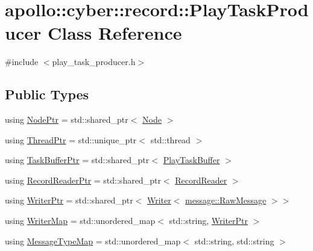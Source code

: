 \hypertarget{classapollo_1_1cyber_1_1record_1_1PlayTaskProducer}{\section{apollo\-:\-:cyber\-:\-:record\-:\-:Play\-Task\-Producer Class Reference}
\label{classapollo_1_1cyber_1_1record_1_1PlayTaskProducer}
}


{\ttfamily \#include $<$play\-\_\-task\-\_\-producer.\-h$>$}

\subsection*{Public Types}
\begin{DoxyCompactItemize}
\item 
using \hyperlink{classapollo_1_1cyber_1_1record_1_1PlayTaskProducer_a60273f70488f8bb52d6112a32ec502bb}{Node\-Ptr} = std\-::shared\-\_\-ptr$<$ \hyperlink{classapollo_1_1cyber_1_1Node}{Node} $>$
\item 
using \hyperlink{classapollo_1_1cyber_1_1record_1_1PlayTaskProducer_a55cdb4cb1be634a50c15e7c78b6b11ff}{Thread\-Ptr} = std\-::unique\-\_\-ptr$<$ std\-::thread $>$
\item 
using \hyperlink{classapollo_1_1cyber_1_1record_1_1PlayTaskProducer_a1a4a252c8c244a445f580a9c768c017d}{Task\-Buffer\-Ptr} = std\-::shared\-\_\-ptr$<$ \hyperlink{classapollo_1_1cyber_1_1record_1_1PlayTaskBuffer}{Play\-Task\-Buffer} $>$
\item 
using \hyperlink{classapollo_1_1cyber_1_1record_1_1PlayTaskProducer_a06a6d2bd59dd7225b3ea570fcc391b14}{Record\-Reader\-Ptr} = std\-::shared\-\_\-ptr$<$ \hyperlink{classapollo_1_1cyber_1_1record_1_1RecordReader}{Record\-Reader} $>$
\item 
using \hyperlink{classapollo_1_1cyber_1_1record_1_1PlayTaskProducer_a6e942a0d93a125434e567f9b1073ce4d}{Writer\-Ptr} = std\-::shared\-\_\-ptr$<$ \hyperlink{classapollo_1_1cyber_1_1Writer}{Writer}$<$ \hyperlink{structapollo_1_1cyber_1_1message_1_1RawMessage}{message\-::\-Raw\-Message} $>$$>$
\item 
using \hyperlink{classapollo_1_1cyber_1_1record_1_1PlayTaskProducer_a044a3f88182daefbe597f7b1bbc49f5d}{Writer\-Map} = std\-::unordered\-\_\-map$<$ std\-::string, \hyperlink{classapollo_1_1cyber_1_1record_1_1PlayTaskProducer_a6e942a0d93a125434e567f9b1073ce4d}{Writer\-Ptr} $>$
\item 
using \hyperlink{classapollo_1_1cyber_1_1record_1_1PlayTaskProducer_add93e531edd181faebfd9917c0c3930e}{Message\-Type\-Map} = std\-::unordered\-\_\-map$<$ std\-::string, std\-::string $>$
\end{DoxyCompactItemize}
